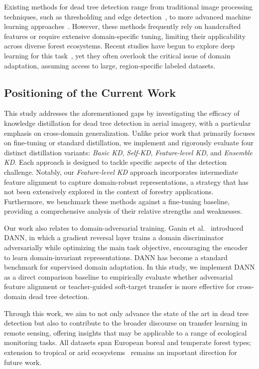 \documentclass[twocolumn]{article}
\begin{document}
Existing methods for dead tree detection range from traditional image processing techniques, such as thresholding and edge detection~\citep{garrity2013quantifying}, to more advanced machine learning approaches~\citep{polewski2018learning}. However, these methods frequently rely on handcrafted features or require extensive domain-specific tuning, limiting their applicability across diverse forest ecosystems. Recent studies have begun to explore deep learning for this task~\citep{briechle2021silvi}, yet they often overlook the critical issue of domain adaptation, assuming access to large, region-specific labeled datasets.

\subsection{Positioning of the Current Work}

This study addresses the aforementioned gaps by investigating the efficacy of knowledge distillation for dead tree detection in aerial imagery, with a particular emphasis on cross-domain generalization. Unlike prior work that primarily focuses on fine-tuning or standard distillation, we implement and rigorously evaluate four distinct distillation variants: \textit{Basic KD}, \textit{Self-KD}, \textit{Feature-level KD}, and \textit{Ensemble KD}. Each approach is designed to tackle specific aspects of the detection challenge. Notably, our \textit{Feature-level KD} approach incorporates intermediate feature alignment to capture domain-robust representations, a strategy that has not been extensively explored in the context of forestry applications. Furthermore, we benchmark these methods against a fine-tuning baseline, providing a comprehensive analysis of their relative strengths and weaknesses.

Our work also relates to domain-adversarial training. Ganin et al.~\citep{ganin2016domain} introduced DANN, in which a gradient reversal layer trains a domain discriminator adversarially while optimizing the main task objective, encouraging the encoder to learn domain-invariant representations. DANN has become a standard benchmark for supervised domain adaptation. In this study, we implement DANN as a direct comparison baseline to empirically evaluate whether adversarial feature alignment or teacher-guided soft-target transfer is more effective for cross-domain dead tree detection.

Through this work, we aim to not only advance the state of the art in dead tree detection but also to contribute to the broader discourse on transfer learning in remote sensing, offering insights that may be applicable to a range of ecological monitoring tasks. All datasets span European boreal and temperate forest types; extension to tropical or arid ecosystems~\citep{cheng2024scattered} remains an important direction for future work.
\end{document}
